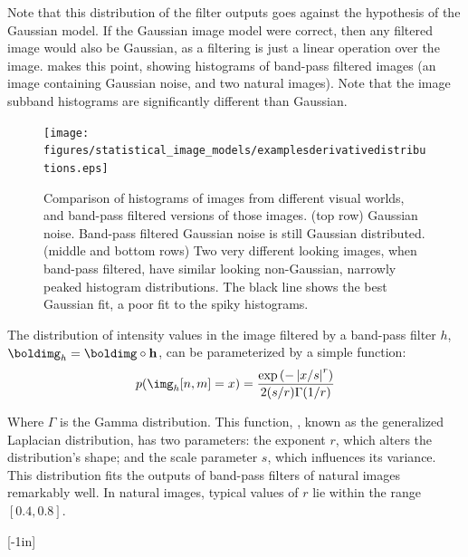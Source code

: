 Note that this distribution of the filter outputs goes against the hypothesis of the Gaussian model. If the Gaussian image model were correct, then any filtered image would also be Gaussian, as a filtering is just a linear operation over the image.     \Fig{\ref{fig:derivativesdistributions}} makes this point, showing histograms of band-pass filtered images (an image containing Gaussian noise, and two natural images).  Note that the image subband histograms are significantly different than Gaussian.

\begin{figure}[t]
\centerline{
\texttt{[image: figures/statistical\_image\_models/examplesderivativedistributions.eps]}
} 
\caption{Comparison of histograms of images from different visual worlds, and band-pass filtered versions of those images. (top row) Gaussian noise.  Band-pass filtered Gaussian noise is still Gaussian distributed.  (middle and bottom rows) Two very different looking images, when band-pass filtered, have similar looking non-Gaussian, narrowly peaked histogram distributions. The black line shows the best Gaussian fit, a poor fit to the spiky histograms.} 
\label{fig:derivativesdistributions}
\end{figure}


The distribution of intensity values in the image filtered by a band-pass filter $h$, $\boldimg_h = \boldimg \circ \mathbf{h}$, can be parameterized by a simple function:
\begin{equation}
p(\img_h[n,m] = x) = \frac{\exp \left(- \left| x/s  \right|^r \right)}{2 (s/r) \Gamma(1/r)}
\label{eq:derdist}
\end{equation}

Where $\Gamma$ is the Gamma distribution. This function, \eqn{\ref{eq:derdist}}, known as the generalized Laplacian distribution, has two parameters: the exponent $r$, which alters the distribution's shape; and the scale parameter $s$, which influences its variance. This distribution fits the outputs of band-pass filters of natural images remarkably well. In natural images, typical values of $r$ lie within the range $\left[0.4, 0.8\right]$.

[-1in]

